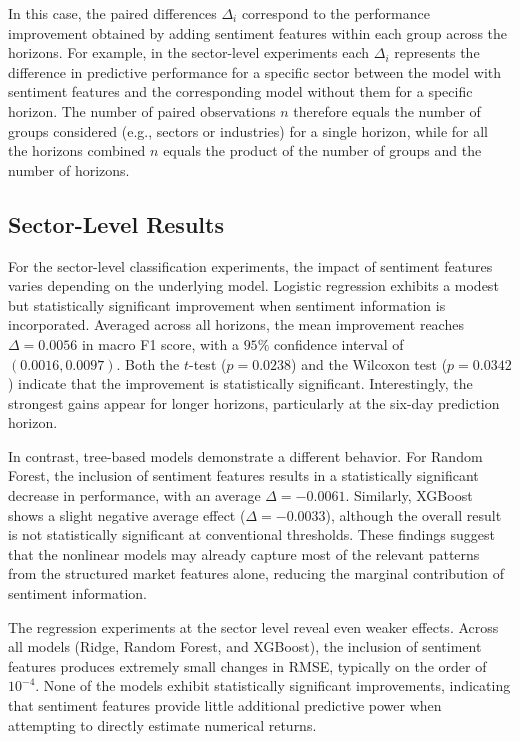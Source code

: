 In this case, the paired differences $\Delta_i$ correspond to the performance improvement obtained by adding sentiment features within each group across the horizons.
For example, in the sector-level experiments each $\Delta_i$ represents the difference in predictive performance for a specific sector between the model with sentiment features and the corresponding model without them for a specific horizon. 
The number of paired observations $n$ therefore equals the number of groups considered (e.g., sectors or industries) for a single horizon, while for all the horizons combined $n$ equals the product of the number of groups and the number of horizons.

\subsection{Sector-Level Results}

For the sector-level classification experiments, the impact of sentiment features varies depending on the underlying model. Logistic regression exhibits a modest but statistically significant improvement when sentiment information is incorporated. Averaged across all horizons, the mean improvement reaches $\Delta = 0.0056$ in macro F1 score, with a $95\%$ confidence interval of $(0.0016, 0.0097)$. Both the $t$-test ($p = 0.0238$) and the Wilcoxon test ($p = 0.0342$) indicate that the improvement is statistically significant. Interestingly, the strongest gains appear for longer horizons, particularly at the six-day prediction horizon.

In contrast, tree-based models demonstrate a different behavior. For Random Forest, the inclusion of sentiment features results in a statistically significant decrease in performance, with an average $\Delta = -0.0061$. Similarly, XGBoost shows a slight negative average effect ($\Delta = -0.0033$), although the overall result is not statistically significant at conventional thresholds. These findings suggest that the nonlinear models may already capture most of the relevant patterns from the structured market features alone, reducing the marginal contribution of sentiment information.

The regression experiments at the sector level reveal even weaker effects. Across all models (Ridge, Random Forest, and XGBoost), the inclusion of sentiment features produces extremely small changes in RMSE, typically on the order of $10^{-4}$. None of the models exhibit statistically significant improvements, indicating that sentiment features provide little additional predictive power when attempting to directly estimate numerical returns.

